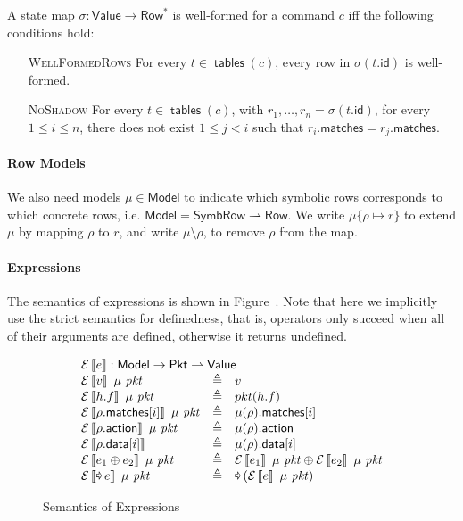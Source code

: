\documentclass{article}
\newcommand{\pkt}{\mathit{pkt}}
\newcommand{\denote}[1]{\left\llbracket#1\right\rrbracket}
\newcommand{\edenote}[1]{\mathcal{E}\denote{#1}}
\newcommand{\binop}{\mathbin{\oplus}}
\newcommand{\unop}{\mathop{\text{\pointer}}}
\newcommand{\Value}{\mathsf{Value}}
\newcommand{\Pkt}{\mathsf{Pkt}}
\newcommand{\Model}{\mathsf{Model}}
\newcommand{\Row}{\mathsf{Row}}
\newcommand{\SymbRow}{\mathsf{SymbRow}}
\newcommand{\matches}{\mathsf{matches}}
\newcommand{\action}{\mathsf{action}}
\newcommand{\data}{\mathsf{data}}
\newcommand{\id}{\mathsf{id}}
\newcommand{\tables}{\mathop{\mathsf{tables}}}
\begin{document}
A state map $\sigma : \Value \to \Row^*$ is well-formed for a command $c$ iff the
following conditions hold:
\begin{enumerate}
\item[\textsc{WellFormedRows}] For every $t\in \tables(c)$, every row in $\sigma(t.\id)$ is well-formed.
\item[\textsc{NoShadow}] For every $t \in \tables(c)$, with $r_1,\ldots,r_n =
  \sigma(t.\id)$, for every $1 \leq i \leq n$, there does not exist $1 \leq j <
  i$ such that $r_i.\matches = r_j.\matches$.
\end{enumerate}
\paragraph{Row Models}
We also need models $\mu \in \Model$ to indicate which symbolic rows corresponds
to which concrete rows, i.e. $\Model = \SymbRow \rightharpoonup \Row$. We write
$\mu\{\rho \mapsto r\}$ to extend $\mu$ by mapping $\rho$ to $r$, and write $\mu
\setminus \rho$, to remove $\rho$ from the map.

\paragraph{Expressions}
The semantics of expressions is shown in Figure~\label{fig:sem-expr}. Note that
here we implicitly use the strict semantics for definedness, that is, operators
only succeed when all of their arguments are defined, otherwise it returns
undefined.

\begin{figure}[H]
  \[\begin{array}{l>{\triangleq}cl}
  \multicolumn{3}{l}{\edenote{e} : \Model \to \Pkt \rightharpoonup \Value }\\
    \edenote{v}~\mu~\pkt &&
    v \\
    \edenote{h.f}~\mu~\pkt &&
    pkt(h.f)\\
    \edenote{\rho.\matches[i]}~\mu~\pkt &&
    \mu(\rho).\matches[i] \\
    \edenote{\rho.\action}~\mu~\pkt &&
    \mu(\rho).\action \\
    \edenote{\rho.\data[i]} &&
    \mu(\rho).\data[i]\\
    \edenote{e_1 \binop e_2}~\mu~\pkt&&
    \edenote{e_1}~\mu~\pkt \binop
    \edenote{e_2}~\mu~\pkt \\
    \edenote{\unop e}~\mu~\pkt &&
    \unop \left(\edenote{e}~\mu~\pkt\right)
  \end{array}
  \]
  \caption{Semantics of Expressions}
  \label{fig:sem-expr}
\end{figure}
\end{document}
